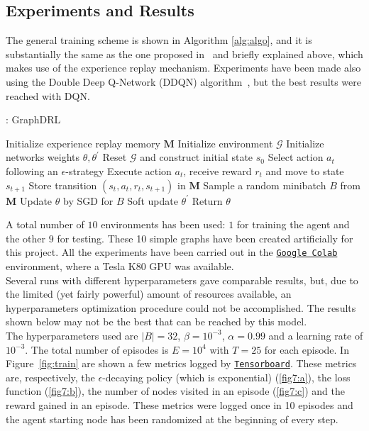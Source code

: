 \documentclass[a4paper]{article}
\begin{document}
\subsection{Experiments and Results}
The general training scheme is shown in Algorithm \ref{alg:algo}, and it is substantially the same as the one proposed in~\cite{mnih2015humanlevel} and briefly explained above, which makes use of the experience replay mechanism. Experiments have been made also using the Double Deep Q-Network (DDQN) algorithm~\cite{drldql}, but the best results were reached with DQN. 

\begin{algorithm}
\caption{: GraphDRL}\label{euclid}
\begin{algorithmic}[1]
\State Initialize experience replay memory $\mathbf{M}$
\State Initialize environment $\mathcal{G}$
\State Initialize networks weights $\theta, \theta^{\prime}$
\State Reset $\mathcal{G}$ and construct initial state $s_0$
\State Select action $a_t$ following an $\epsilon$-strategy
\State Execute action $a_t$, receive reward $r_t$ and move to state $s_{t+1}$
\State Store transition $(s_t, a_t, r_t, s_{t+1})$ in $\mathbf{M}$
\State Sample a random minibatch $B$ from $\mathbf{M}$
\State Update $\theta$ by SGD for $B$%
\State Soft update $\theta^{\prime}$
\EndFor
\EndFor
\State Return $\theta$
\end{algorithmic}
\label{alg:algo}
\end{algorithm}

A total number of $10$ environments has been used: $1$ for training the agent and the other $9$ for testing. These 10 simple graphs have been created artificially for this project. All the experiments have been carried out in the \href{https://colab.research.google.com/}{\texttt{Google Colab}} environment, where a Tesla K80 GPU was available.\\
Several runs with different hyperparameters gave comparable results, but, due to the limited (yet fairly powerful) amount of resources available, an hyperparameters optimization procedure could not be accomplished. The results shown below may not be the best that can be reached by this model.\\
The hyperparameters used are $|B| = 32$, $\beta = 10^{-3}$, $\alpha = 0.99$ and a learning rate of $10^{-3}$. The total number of episodes is $E = 10^4$ with $T = 25$ for each episode. In Figure~\ref{fig:train} are shown a few metrics logged by \href{https://www.tensorflow.org/tensorboard/}{\texttt{Tensorboard}}. These metrics are, respectively, the $\epsilon$-decaying policy (which is exponential) (\ref{fig7:a}), the loss function (\ref{fig7:b}), the number of nodes visited in an episode (\ref{fig7:c}) and the reward gained in an episode. These metrics were logged once in 10 episodes and the agent starting node has been randomized at the beginning of every step.
\end{document}
